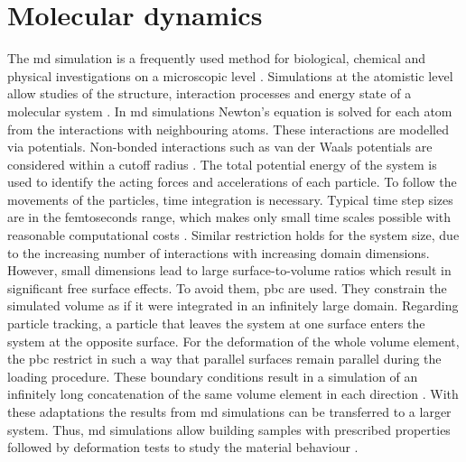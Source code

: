 \section{Molecular dynamics} \label{sec: MDBasics}
The \acrshort{md} simulation is a frequently used method for biological, chemical and physical investigations on a microscopic level \cite{tuckerman_understanding_2000}. Simulations at the atomistic level allow studies of the structure, interaction processes and energy state of a molecular system \cite{van_gunsteren_computer_1990}.  
In \acrshort{md} simulations Newton's equation is solved for each atom from the interactions with neighbouring atoms. These interactions are modelled via potentials. Non-bonded interactions such as van der Waals potentials are considered within a cutoff radius \cite{ries_mechanical_2024}. The total potential energy of the system is used to identify the acting forces and accelerations of each particle. To follow the movements of the particles, time integration is necessary. Typical time step sizes are in the femtoseconds range, which makes only small time scales possible with reasonable computational costs \cite{ries_mechanical_2024}. Similar restriction holds for the system size, due to the increasing number of interactions with increasing domain dimensions. However, small dimensions lead to large surface-to-volume ratios which result in significant free surface effects. To avoid them, \acrfull{pbc} are used. They constrain the simulated volume as if it were integrated in an infinitely large domain. Regarding  particle tracking, a particle that leaves the system at one surface enters the system at the opposite surface. For the deformation of the whole volume element, the \acrshort{pbc} restrict in such a way that parallel surfaces remain parallel during the loading procedure. These boundary conditions result in a simulation of an infinitely long concatenation of the same volume element in each direction \cite{gorbunov_periodic_2022}.
With these adaptations the results from \acrshort{md} simulations can be transferred to a larger system. 
Thus, \acrshort{md} simulations allow building samples with prescribed properties followed by deformation tests to study the material behaviour \cite{buyukozturk_structural_2011}. 

